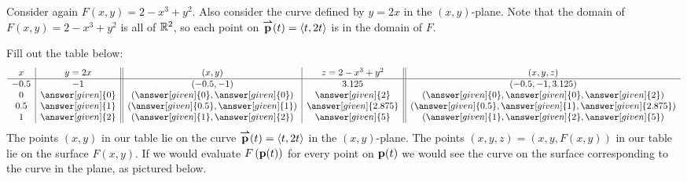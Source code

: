 \documentclass{ximera}
\begin{document}
\begin{example}
Consider again $F(x,y) = 2-x^3+y^2$.  Also consider the curve defined by $y=2x$ in the $(x,y)$-plane.  Note that the domain of $F(x,y) = 2-x^3+y^2$ is all of $\mathbb R^2$, so each point on ${\overset{\boldsymbol{\rightharpoonup}}{\mathbf{p}}}\hspace{0in}(t) = \left\langle t, 2t\right\rangle$ is in the domain of $F$.

Fill out the table below:
\[
\begin{array}{c|c||c|c||c}
x & y =2x & (x,y) & z=2-x^3+y^2 & (x,y,z) \\
\hline
-0.5 & -1 & \left(-0.5,-1\right) &3.125 & \left(-0.5, -1,3.125\right)\\
0 & \answer[given]{0} & \left(\answer[given]{0},\answer[given]{0}\right) & \answer[given]{2}          & \left(\answer[given]{0},\answer[given]{0},    \answer[given]{2}\right) \\
0.5 & \answer[given]{1} & \left(\answer[given]{0.5}, \answer[given]{1}\right) &  \answer[given]{2.875}  & \left(\answer[given]{0.5}, \answer[given]{1}, \answer[given]{2.875}\right)\\
1 & \answer[given]{2} & \left(\answer[given]{1},\answer[given]{2}\right) & \answer[given]{5}          & \left(\answer[given]{1}, \answer[given]{2},   \answer[given]{5}\right)
\end{array}
\]
The points $(x,y)$ in our table lie on the curve ${\overset{\boldsymbol{\rightharpoonup}}{\mathbf{p}}}\hspace{0in}(t) = \left\langle t, 2t\right\rangle$ in the $(x,y)$-plane.  The points $(x,y,z) = (x,y,F(x,y))$ in our table lie on the surface $F(x,y)$.  If we would evaluate $F\left (\mathbf{p}(t) \right )$ for every point on $\mathbf{p}(t)$ we would see the curve on the surface corresponding to the curve in the plane, as pictured below.

\begin{image}
\end{image}
\end{example}
\end{document}
